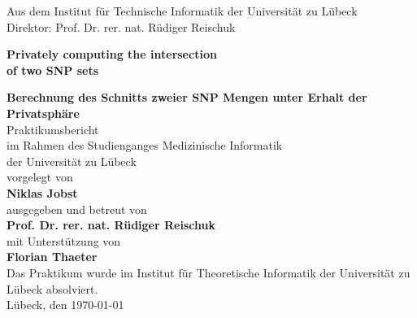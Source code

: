 
\addtolength{\topmargin}{-1.2cm} 
\addtolength{\textwidth}{2.35cm} 

\vspace*{-2.7cm}


\vspace*{0.4cm}
\begin{center}


\enlargethispage{5cm}
Aus dem Institut f\"ur
Technische Informatik
der Universit\"at zu L\"ubeck\\
Direktor: Prof. Dr. rer. nat. Rüdiger Reischuk\\[1.8cm]
%

\begin{large}
\textcolor{Ocean}{{\textbf {Privately computing the intersection } }}\\ %
\textcolor{Ocean}{{\textbf {of two SNP sets} }}\\ %
\end{large}
\vspace*{1.5cm}
%
{{\textbf{Berechnung des Schnitts zweier SNP Mengen unter Erhalt der Privatsphäre} }}\\ %

\vspace*{2cm}
%
Praktikumsbericht\\ 
im Rahmen des Studienganges Medizinische Informatik\\
der Universit\"at zu L\"ubeck\\[1.0cm]
%
vorgelegt von\\[0.1cm]
\textbf{Niklas Jobst}\\[1.0cm]
%
ausgegeben und betreut von\\[0.1cm]
\textbf{Prof. Dr. rer. nat. Rüdiger Reischuk}\\[0.3cm]
mit Unterst\"utzung von\\[0.1cm]
\textbf{Florian Thaeter}\\[1.8cm]
Das Praktikum wurde im Institut für Theoretische Informatik der Universit\"at zu L\"ubeck absolviert.
%
\\[2.2cm]

L\"ubeck, den \today
\end{center}
  
